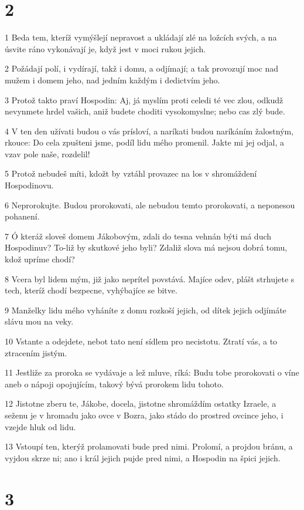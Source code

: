 \chapter{2}

\par 1 Beda tem, kteríž vymýšlejí nepravost a ukládají zlé na ložcích svých, a na úsvite ráno vykonávají je, když jest v moci rukou jejich.
\par 2 Požádají polí, i vydírají, takž i domu, a odjímají; a tak provozují moc nad mužem i domem jeho, nad jedním každým i dedictvím jeho.
\par 3 Protož takto praví Hospodin: Aj, já myslím proti celedi té vec zlou, odkudž nevynmete hrdel vašich, aniž budete choditi vysokomyslne; nebo cas zlý bude.
\par 4 V ten den užívati budou o vás prísloví, a naríkati budou naríkáním žalostným, rkouce: Do cela zpušteni jsme, podíl lidu mého promenil. Jakte mi jej odjal, a vzav pole naše, rozdelil!
\par 5 Protož nebudeš míti, kdožt by vztáhl provazec na los v shromáždení Hospodinovu.
\par 6 Neprorokujte. Budou prorokovati, ale nebudou temto prorokovati, a neponesou pohanení.
\par 7 Ó kteráž sloveš domem Jákobovým, zdali do tesna vehnán býti má duch Hospodinuv? To-liž by skutkové jeho byli? Zdaliž slova má nejsou dobrá tomu, kdož upríme chodí?
\par 8 Vcera byl lidem mým, již jako neprítel povstává. Majíce odev, plášt strhujete s tech, kteríž chodí bezpecne, vyhýbajíce se bitve.
\par 9 Manželky lidu mého vyháníte z domu rozkoší jejich, od dítek jejich odjímáte slávu mou na veky.
\par 10 Vstante a odejdete, nebot tato není sídlem pro necistotu. Ztratí vás, a to ztracením jistým.
\par 11 Jestliže za proroka se vydávaje a lež mluve, ríká: Budu tobe prorokovati o víne aneb o nápoji opojujícím, takový bývá prorokem lidu tohoto.
\par 12 Jistotne zberu te, Jákobe, docela, jistotne shromáždím ostatky Izraele, a seženu je v hromadu jako ovce v Bozra, jako stádo do prostred ovcince jeho, i vzejde hluk od lidu.
\par 13 Vstoupí ten, kterýž prolamovati bude pred nimi. Prolomí, a projdou bránu, a vyjdou skrze ni; ano i král jejich pujde pred nimi, a Hospodin na špici jejich.

\chapter{3}

